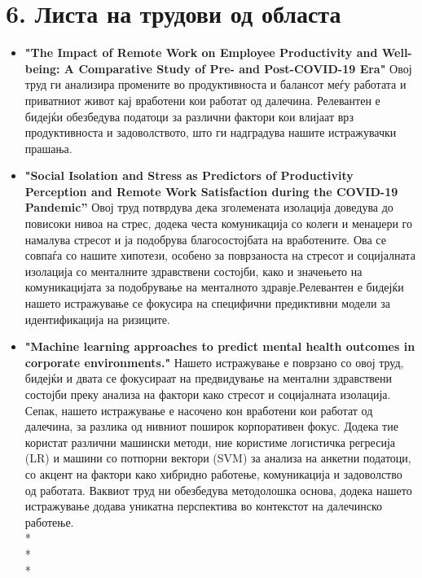 \documentclass[12pt]{article}
\begin{document}
\section*{6. Листа на трудови од областа}
\begin{itemize}
    \item \textbf {"The Impact of Remote Work on Employee Productivity and Well-being: A Comparative Study of Pre- and Post-COVID-19 Era"}
    Овој труд ги анализира промените во продуктивноста и балансот меѓу работата и приватниот живот кај вработени кои работат од далечина. Релевантен е бидејќи обезбедува податоци за различни фактори кои влијаат врз продуктивноста и задоволството, што ги надградува нашите истражувачки прашања.
    \item \textbf {"Social Isolation and Stress as Predictors of Productivity Perception and Remote Work Satisfaction during the COVID-19 Pandemic”}
    Овој труд потврдува дека зголемената изолација доведува до повисоки нивоа на стрес, додека честа комуникација со колеги и менаџери го намалува стресот и ја подобрува благосостојбата на вработените. Ова се совпаѓа со нашите хипотези, особено за поврзаноста на стресот и социјалната изолација со менталните здравствени состојби, како и значењето на комуникацијата за подобрување на менталното здравје.Релевантен е бидејќи нашето истражување се фокусира на специфични предиктивни модели за идентификација на ризиците.
    \item \textbf {"Machine learning approaches to predict mental health outcomes in corporate environments."}
    Нашето истражување е поврзано со овој труд, бидејќи и двата се фокусираат на предвидување на ментални здравствени состојби преку анализа на фактори како стресот и социјалната изолација. Сепак, нашето истражување е насочено кон вработени кои работат од далечина, за разлика од нивниот поширок корпоративен фокус. Додека тие користат различни машински методи, ние користиме логистичка регресија (LR) и машини со потпорни вектори (SVM) за анализа на анкетни податоци, со акцент на фактори како хибридно работење, комуникација и задоволство од работата. Ваквиот труд ни обезбедува методолошка основа, додека нашето истражување додава уникатна перспектива во контекстот на далечинско работење.
    \\*
    \\*
    \\*
\end{itemize}
\end{document}
